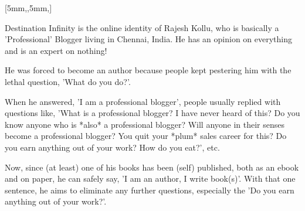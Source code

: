 \documentclass[
    coverheight=148mm, coverwidth=105mm, spinewidth=10mm,
    bleedwidth=31mm,
    foldingmargin=true, 12pt
]{bookcover}
\begin{document}
\begin{bookcover}
    [5mm,,5mm,]{
        \setlength{\parskip}{1ex}
        \vfill
        Destination Infinity is the online identity of Rajesh Kollu, who is basically a
        'Professional' Blogger living in Chennai, India. He has an opinion on everything
        and is an expert on nothing!

        He was forced to become an author because people kept pestering him with the
        lethal question, 'What do you do?'.

        When he answered, 'I am a professional blogger', people usually replied with
        questions like, 'What is a professional blogger? I have never heard of this? Do
        you know anyone who is *also* a professional blogger? Will anyone in their
        senses become a professional blogger? You quit your *plum* sales career for
        this? Do you earn anything out of your work? How do you eat?', etc.

        Now, since (at least) one of his books has been (self) published, both as an
        ebook and on paper, he can safely
        say, 'I am an author, I write book(s)'. With that one sentence, he aims to
        eliminate any further questions, especially the 'Do you earn anything out of
        your work?'.

}
\end{bookcover}
\end{document}
